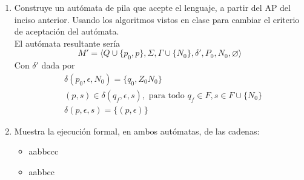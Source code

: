 \documentclass{article}
\begin{document}
\begin{enumerate}
{\begin{enumerate}
{	        \begin{itemize}
	        	\item {
	        		$Q = \{q_0\} \cup Q_1 \cup Q_2$
	        	}
	        	
	        	\item {
	        		$\Sigma = \{a, b, c\}$
	        	}
	        	\item {
	        		$\Gamma = \{A, B, Z_0\}$
	        	}
	        	\item {
	        		\begin{align*}
	        		&\delta (q_0, \epsilon, Z_0) = \{(q_1, Z_0),
	        		(q_6, Z_0)\}\\
	        		&\delta (p, s, \gamma) = \delta_1 (p, s, \gamma) \cup
	        		\delta_2 (p, s, \gamma) 		
	        		\end{align*}
	        		Donde $p$ es cualquier estado que no sea $q_0$, $s$ un símbolo de $\Sigma$	y $\gamma$ cualquier símbolo de $\Gamma$.
	        	}
	        	\item {
	        		$q_0$ es el estado inicial.
	        	}
	        	\item {
	        		$Z_0$ es el símbolo al fondo de la pila.
	        	}
	        	\item {
	        		$F = F_1 \cup F_2$
	        	}
	        \end{itemize}
	        }
        	\item{
            Construye un autómata de pila que acepte el lenguaje, a partir del
            AP del inciso anterior. Usando los algoritmos vistos en clase para
            cambiar el criterio de aceptación del autómata.\\
            El autómata resultante sería 
            \[M' = \langle Q \cup \{p_0, p\} , \Sigma, \Gamma \cup \{N_0\} , \delta', P_0 , N_0, \varnothing \rangle\]
            Con $\delta'$ dada por
            \begin{align*}
            	&\delta(p_0, \epsilon, N_0) = \{q_0, Z_0N_0\}\\
            	&(p,s) \in \delta(q_f, \epsilon, s), \text{ para todo } q_f \in F, s \in F \cup \{N_0\}\\
            	&\delta(p, \epsilon, s) = \{(p,\epsilon)\}
            \end{align*}
           }   	
        	\item{
        	Muestra la ejecución formal, en ambos autómatas, de las cadenas:
        	
        	\begin{itemize}
        		\item {
        		aabbccc\\
        		
        		
        		}
        		\item {
        		aabbcc\\
        		
        		}
        	\end{itemize}
        		
        	}
        
        \end{enumerate}
    	}
    \end{enumerate}
\end{document}
